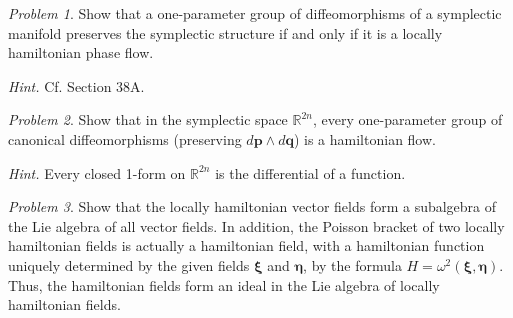 \documentclass{book}
\numberwithin{equation}{section}
\theoremstyle{plain}
\theoremstyle{definition}
\theoremstyle{remark}
\theoremstyle{smallcap}
\newtheorem*{prob*}{Problem}
\numberwithin{prob}{section}
\newcommand{\hint}[1]{\textit{Hint.} #1}
\begin{document}
\begin{prob*}
  Show that a one-parameter group of diffeomorphisms of
  a symplectic manifold preserves the symplectic structure
  if and only if it is a locally hamiltonian phase flow.

  \hint{ Cf. Section 38A. }

\end{prob*}

\begin{prob*}
  Show that in the symplectic space $\mathbb R^{2n}$,
  every one-parameter group of canonical diffeomorphisms
  (preserving $d\mathbf p \wedge d\mathbf q$)
  is a hamiltonian flow.

  \hint{Every closed 1-form on $\mathbb R^{2n}$ is the differential of a function.}

\end{prob*}

\begin{prob*}
  Show that the locally hamiltonian vector fields form
  a subalgebra of the Lie algebra of all vector fields.
  In addition, the Poisson bracket of two locally hamiltonian fields
  is actually a hamiltonian field, with a hamiltonian function
  uniquely determined by the given fields $\pmb\xi$ and $\pmb\eta$,
  by the formula $H=\omega^2(\pmb\xi, \pmb\eta)$.
  Thus, the hamiltonian fields form an ideal
  in the Lie algebra of locally hamiltonian fields.
\end{prob*}
\end{document}
